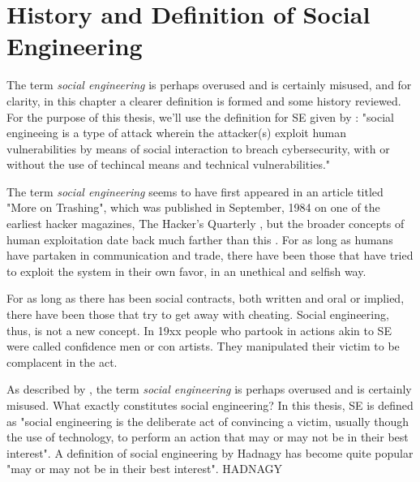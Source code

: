 

    

\chapter{History and Definition of Social Engineering\label{definition}}

The term \textit{social engineering} is perhaps overused and is certainly misused, and for clarity, in this chapter a clearer definition is formed and some history reviewed. For the purpose of this thesis, we'll use the definition for SE given by \cite{wang_defining_2020}: "social engineeing is a type of attack wherein the attacker(s) exploit human vulnerabilities by means of social interaction to breach cybersecurity, with or without the use of techincal means and technical vulnerabilities."

The term \textit{social engineering} seems to have first appeared in an article titled "More on Trashing", which was published in September, 1984 on one of the earliest hacker magazines, The Hacker's Quarterly \citep{wang_defining_2020}, but the broader concepts of human exploitation date back much farther than this \citep{qin_investigation_2007}. For as long as humans have partaken in communication and trade, there have been those that have tried to exploit the system in their own favor, in an unethical and selfish way.


For as long as there has been social contracts, both written and oral or implied, there have been those that try to get away with cheating. Social engineering, thus, is not a new concept. In 19xx people who partook in actions akin to SE were called confidence men or con artists. They manipulated their victim to be complacent in the act.

As described by \cite{abiteboul}, the term \textit{social engineering} is perhaps overused and is certainly misused. What exactly constitutes social engineering? In this thesis, SE is defined as "social engineering is the deliberate act of convincing a victim, usually though the use of technology, to perform an action that may or may not be in their best interest". A definition of social engineering by Hadnagy has become quite popular "may or may not be in their best interest". HADNAGY

